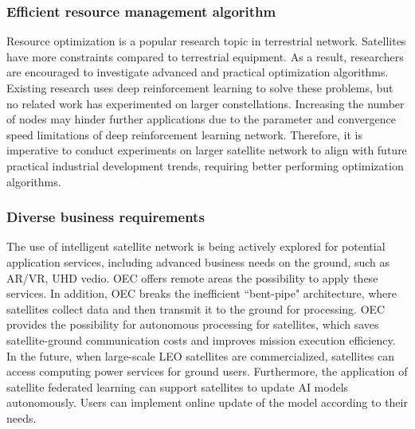 \documentclass[lettersize,journal]{IEEEtran}
\begin{document}
\subsubsection*{Efficient resource management algorithm}
Resource optimization is a popular research topic in terrestrial network. Satellites have more constraints compared to terrestrial equipment. As a result, researchers are encouraged to investigate advanced and practical optimization algorithms. Existing research uses deep reinforcement learning to solve these problems, but no related work has experimented on larger constellations. Increasing the number of nodes may hinder further applications due to the parameter and convergence speed limitations of deep reinforcement learning network. Therefore, it is imperative to conduct experiments on larger satellite network to align with future practical industrial development trends, requiring better performing optimization algorithms.

\subsubsection*{Diverse business requirements}
The use of intelligent satellite network is being actively explored for potential application services,  including advanced business needs on the ground, such as AR/VR, UHD vedio. OEC offers remote areas the possibility to apply these services. In addition, OEC breaks the inefficient ``bent-pipe" architecture, where satellites collect data and then transmit it to the ground for processing. OEC provides the possibility for autonomous processing for satellites, which saves satellite-ground communication costs and improves mission execution efficiency. In the future, when large-scale LEO satellites are commercialized, satellites can access computing power services for ground users. Furthermore, the application of satellite federated learning can support satellites to update AI models autonomously. Users can implement online update of the model according to their needs. 
\end{document}
